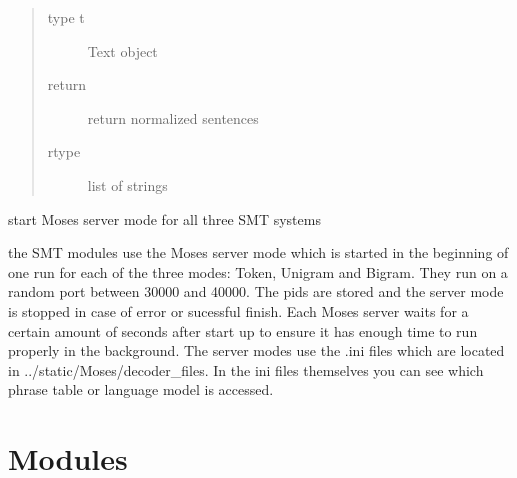 \documentclass[letterpaper,10pt,english]{sphinxmanual}
\begin{document}
\begin{fulllineitems}
\begin{fulllineitems}
\begin{description}
\begin{quote}
\begin{description}
\item[{type t}] \leavevmode
Text object

\item[{return}] \leavevmode
return normalized sentences

\item[{rtype}] \leavevmode
list of strings

\end{description}\end{quote}

\end{description}

\end{fulllineitems}


\begin{fulllineitems}
\label{API:norm.normalizer.Normalizer.start_server_mode}
start Moses server mode for all three SMT systems

the SMT modules use the Moses server mode which is started in the beginning of 
one run for each of the three modes: Token, Unigram and Bigram. They run on a random 
port between 30000 and 40000. The pids are stored and the server mode is stopped in case of
error or sucessful finish. Each Moses server waits for a certain amount of seconds after         start up to ensure it has enough time to run properly in the background.
The server modes use the .ini files which are located in ../static/Moses/decoder\_files. In              the ini files themselves you can see which phrase table or language model is accessed.

\end{fulllineitems}


\end{fulllineitems}



\section{Modules}
\label{API:modules}\label{API:module-norm.modules.abbreviation}
\end{document}
